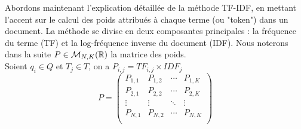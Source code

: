 \documentclass[12pt]{article}
\theoremstyle{definition}
\begin{document}
	
	
	Abordons maintenant l'explication détaillée de la méthode TF-IDF, en mettant l'accent sur le calcul des poids attribués à chaque terme (ou "token") dans un document. La méthode se divise en deux composantes principales : la fréquence du terme (TF) et la log-fréquence inverse du document (IDF). Nous noterons dans la suite $P\in \mathcal{M}_{N,K}(\mathbb{R})$ la matrice des poids.\\
	
	
	Soient $q_i\in Q$ et $T_j\in T$, on a $P_{i,j} = TF_{i,j}\times IDF_j$
	$$P = \begin{pmatrix}
		P_{1,1} & P_{1,2} & \cdots & P_{1,K} \\
		P_{2,1} & P_{2,2} & \cdots & P_{2,K} \\
		\vdots  & \vdots  & \ddots & \vdots  \\
		P_{N,1} & P_{N,2} & \cdots & P_{N,K} \\
	\end{pmatrix}$$
	
\end{document}
